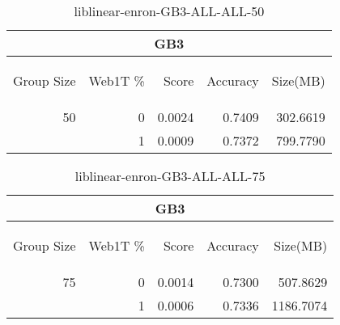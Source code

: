 \begin{center}
\begin{table}[htbp]
\begin{tabular}{ | r | r | r | r | r |}
\hline
\multicolumn{5}{|c|}{GB3}\\
\hline
\begin{sideways}Group Size\end{sideways} & \begin{sideways}Web1T \%\end{sideways} & \begin{sideways}Score\end{sideways} & \begin{sideways}Accuracy\end{sideways} & \begin{sideways}Size(MB)\end{sideways}\\
\hline
\multirow{1}{*}{50}
 & 0 & 0.0024 & 0.7409 & 302.6619\\ \cline{2-5}
 & 1 & 0.0009 & 0.7372 & 799.7790\\ \cline{2-5}
\hline
\end{tabular}
\caption{liblinear-enron-GB3-ALL-ALL-50}
\label{table:liblinear-enron-GB3-ALL-ALL-50}
\end{table}
\end{center}

\begin{center}
\begin{table}[htbp]
\begin{tabular}{ | r | r | r | r | r |}
\hline
\multicolumn{5}{|c|}{GB3}\\
\hline
\begin{sideways}Group Size\end{sideways} & \begin{sideways}Web1T \%\end{sideways} & \begin{sideways}Score\end{sideways} & \begin{sideways}Accuracy\end{sideways} & \begin{sideways}Size(MB)\end{sideways}\\
\hline
\multirow{1}{*}{75}
 & 0 & 0.0014 & 0.7300 & 507.8629\\ \cline{2-5}
 & 1 & 0.0006 & 0.7336 & 1186.7074\\ \cline{2-5}
\hline
\end{tabular}
\caption{liblinear-enron-GB3-ALL-ALL-75}
\label{table:liblinear-enron-GB3-ALL-ALL-75}
\end{table}
\end{center}

